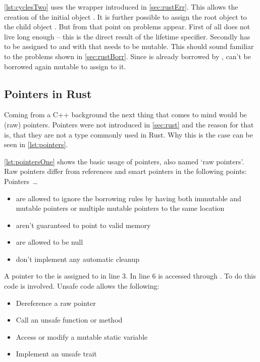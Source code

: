 \documentclass[thesis]{subfiles}
\begin{document}
    \autoref{lst:cyclesTwo} uses the  wrapper introduced in \autoref{sec:rustErr}.
    This allows the creation of the initial \Node object .
    It is further possible to assign the root object  to the child object .
    But from that point on problems appear.
    First of all does  not live long enough -- this is the direct result of the lifetime specifier.
    Secondly has  to be assigned to  and with that needs  to be mutable.
    This should sound familiar to the problems shown in \autoref{sec:rustBorr}.
    Since  is already borrowed by ,  can't be borrowed again mutable to assign  to it.

  \subsection{Pointers in Rust}
    Coming from a C++ background the next thing that comes to mind would be (raw) pointers.
    Pointers were not introduced in \autoref{sec:rust} and the reason for that is, that they are not a type commonly used in Rust\autocite[Raw Pointers]{rust-book1}.
    Why this is the case can be seen in \autoref{lst:pointers}.

    \autoref{lst:pointersOne} shows the basic usage of pointers, also named `raw pointers'.
    Raw pointers differ from references and smart pointers in the following points\autocite[Unsafe Rust]{rust-book}: Pointers~\ldots
    \begin{itemize}
      \item are allowed to ignore the borrowing rules by having both immutable and mutable pointers or multiple mutable pointers to the same location
      \item aren't guaranteed to point to valid memory
      \item are allowed to be null
      \item don’t implement any automatic cleanup
    \end{itemize}
    A pointer to the \String {} is assigned to  in line 3.
    In line 6  is accessed through .
    To do this  code is involved.
    Unsafe code allows the following\autocite[Unsafe Rust]{rust-book}:
    \begin{itemize}
      \item Dereference a raw pointer
      \item Call an unsafe function or method
      \item Access or modify a mutable static variable
      \item Implement an unsafe trait
    \end{itemize}
\end{document}
